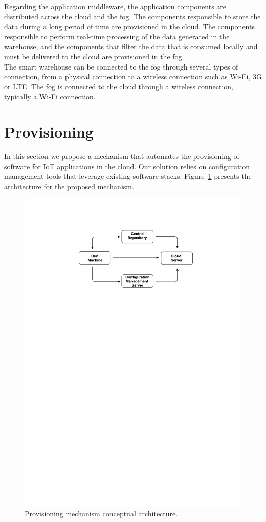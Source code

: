 Regarding the application middleware, the application components are distributed across the cloud and
the fog. The components responsible to store the data during a long period of time are provisioned in
the cloud. The components responsible to perform real-time processing of the data generated in the
warehouse, and the components that filter the data that is consumed locally and must be delivered to
the cloud are provisioned in the fog.\\

The smart warehouse can be connected to the fog through several types of connection, from a physical
connection to a wireless connection such as Wi-Fi, 3G or \gls{LTE}. The fog is connected to the cloud
through a wireless connection, typically a Wi-Fi connection.

\section{Provisioning}
\label{sec:provisioning}
In this section we propose a mechanism that automates the provisioning of software for \gls{IoT} applications
in the cloud. Our solution relies on configuration management tools that leverage existing software
stacks. Figure~\ref{fig:provisioning_generic_architecture} presents the architecture for the proposed
mechanism.\\

\begin{figure}[ht!]
  \centering
  \includegraphics[width=.7\textwidth]{images/c4t-generic-solution.pdf}
  \caption[Provisioning mechanism conceptual architecture.]{Provisioning mechanism conceptual architecture.}
  \label{fig:provisioning_generic_architecture}
\end{figure}

